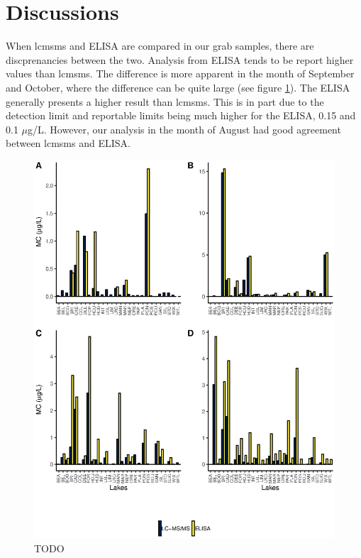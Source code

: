 \section{Discussions}

When \gls{lcmsms} and ELISA are compared in our grab samples, there are discprenancies between the two. Analysis from ELISA tends to be report higher values than \gls{lcmsms}. The difference is more apparent in the month of September and October, where the difference can be quite large (see figure \ref{fig:compare}). The ELISA generally presents a higher result than \gls{lcmsms}. This is in part due to the detection limit and reportable limits being much higher for the ELISA, 0.15 and 0.1 $\mu$g/L. However, our analysis in the month of August had good agreement between \gls{lcmsms} and ELISA.  

\begin{figure}[!h]
	\includegraphics[width=\textwidth]{figures/compare}
	\caption{TODO}
	\label{fig:compare}
\end{figure}


